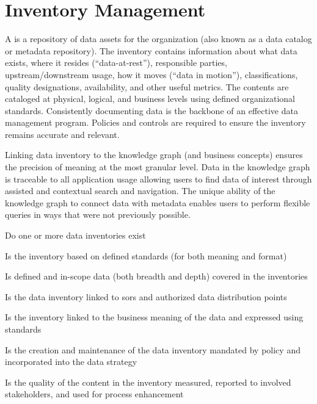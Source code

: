 \section{Inventory Management}\label{sec:ekgmm-b-2-3} %

A  is a repository of data assets for the organization (also known as a
data catalog or metadata repository).
The inventory contains information about what data exists, where it resides (“data-at-rest”),
responsible parties, upstream/downstream usage, how it moves (“data in motion”), classifications,
quality designations, availability, and other useful metrics.
The contents are cataloged at physical, logical, and business levels using defined organizational standards.
Consistently documenting data is the backbone of an effective data management program.
Policies and controls are required to ensure the inventory remains accurate and relevant.

\ekgmmContextSection

Linking data inventory to the knowledge graph (and business concepts) ensures the precision of meaning at the most
granular level.
Data in the knowledge graph is traceable to all application usage allowing users to find data of interest through
assisted and contextual search and navigation.
The unique ability of the knowledge graph to connect data with metadata enables users to perform flexible queries
in ways that were not previously possible.

\kgmmcorequestionssection

\begin{core-questions}

  \item [\thesection.1] Do one or more data inventories exist
  \item [\thesection.2] Is the inventory based on defined standards (for both meaning and format)
  \item [\thesection.3] Is defined and in-scope data (both breadth and depth) covered in the inventories
  \item [\thesection.4] Is the data inventory linked to \glspl{sor} and authorized data distribution points
  \item [\thesection.5] Is the inventory linked to the business meaning of the data and expressed using standards
  \item [\thesection.6] Is the creation and maintenance of the data inventory mandated by policy and incorporated
                        into the data strategy
  \item [\thesection.7] Is the quality of the content in the inventory measured, reported to involved stakeholders,
                        and used for process enhancement

\end{core-questions}

